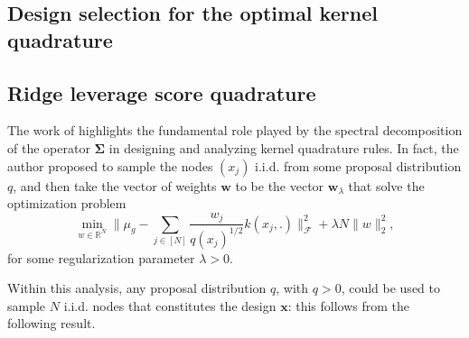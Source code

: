 \documentclass[twoside,11pt]{book}
\begin{document}
\subsection{Design selection for the optimal kernel quadrature}
\label{subsec:okq_analysis_paradigm}
\subsection{Ridge leverage score quadrature}
\label{subsec:okq_algebraic_paradigm}

The work of \cite{Bac17} highlights the fundamental role played by the spectral decomposition of the operator $\bm{\Sigma}$ in designing and analyzing kernel quadrature rules.
In fact, the author proposed to sample the nodes $(x_j)$ i.i.d. from some proposal distribution $q$, and then take the vector of weights $\bm{w}$ to be the vector $\bm{w}_{\lambda}$ that solve the optimization problem
\begin{equation}\label{eq:reg_kernel_opt_problem}
\min\limits_{w \in \mathbb{R}^{N}} \Big\| \mu_{g} - \sum\limits_{j \in [N]} \frac{w_{j}}{q(x_{j})^{1/2}} k(x_{j},.) \Big\|_{\mathcal{F}}^{2} + \lambda N \|w\|_{2}^{2},
\end{equation}
for some regularization parameter $\lambda>0$. 



 


Within this analysis, any proposal distribution $q$, with $q>0$, could be used to sample $N$ i.i.d. nodes that constitutes the design $\bm{x}$: this follows from the following result.
\end{document}
